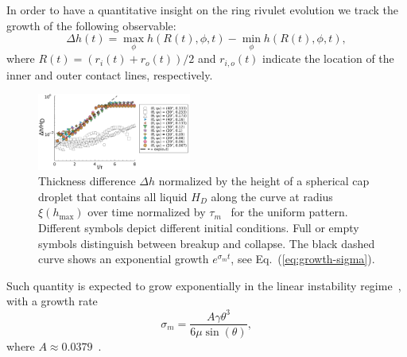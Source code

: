 \documentclass[twoside,twocolumn,9pt]{article}
\begin{document}
In order to have a quantitative insight on the ring rivulet evolution we track the growth of the following 
observable:
\begin{equation}\label{eq:delta-h-measure}
       \Delta h(t) = \max_{\phi}h(R(t),\phi,t) - \min_{\phi}h(R(t),\phi,t),
\end{equation}
where $R(t) = (r_i(t)+r_o(t))/2$ and $r_{i,o}(t)$ indicate the location of the inner and outer contact lines, 
respectively. 

\begin{figure}
    \centering
    \includegraphics[width=0.45\textwidth]{assets/growth-breakup.pdf}
    \caption{Thickness difference $\Delta h$ normalized by the height of a spherical cap droplet that contains all liquid $H_D$ along the curve at radius $\xi(h_{\max})$ over time normalized by $\tau_{m}$~\cite{wuBreakupPatternedNanoscale2010} for the uniform pattern. 
    Different symbols depict different initial conditions. 
    Full or empty symbols distinguish between breakup and collapse. 
    The black dashed curve shows an exponential growth $e^{\sigma_m t}$, see Eq.~(\ref{eq:growth-sigma}).
    }
    \label{fig:first_growth}
\end{figure}
Such quantity is expected to grow exponentially in the linear instability regime~\cite{wuBreakupPatternedNanoscale2010, gonzalezStabilityLiquidRing2013, nguyenCompetitionCollapseBreakup2012}, with a growth rate
\begin{equation}\label{eq:growth-sigma}
    \sigma_m = \frac{A \gamma \theta^3}{6\mu\sin(\theta)}, 
\end{equation}
where $A \approx 0.0379$~\cite{wuBreakupPatternedNanoscale2010, diezBreakupFluidRivulets2009}.
\end{document}
